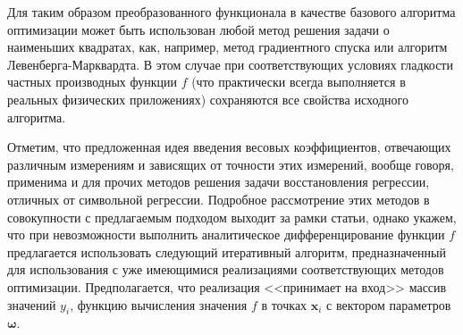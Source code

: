 \documentclass[tikz,10pt,a4paper]{article}
\newcommand{\bomega}{\boldsymbol{\omega}}
\begin{document}

Для таким образом преобразованного функционала
в качестве базового алгоритма оптимизации может
быть использован любой метод решения задачи о наименьших квадратах, как, например,
метод градиентного спуска или алгоритм Левенберга-Марквардта\cite{dlib09}.
В этом случае при
соответствующих условиях гладкости частных производных функции $f$ (что практически
всегда выполняется в реальных физических приложениях) сохраняются все свойства
исходного алгоритма.

Отметим, что предложенная идея введения весовых коэффициентов, отвечающих различным
измерениям и зависящих от точности этих измерений, вообще говоря, применима и для
прочих методов решения задачи восстановления регрессии, отличных от символьной регрессии.
Подробное рассмотрение этих методов в совокупности с предлагаемым подходом выходит за рамки
статьи, однако укажем, что при невозможности выполнить аналитическое
дифференцирование функции $f$ предлагается использовать следующий
итеративный алгоритм, предназначенный для использования с уже имеющимися
реализациями соответствующих методов оптимизации. Предполагается, что реализация
<<принимает на вход>> массив значений $y_i$,
функцию вычисления значения $f$ в точках $\mathbf{x}_i$ с вектором параметров $\bomega$.
\end{document}
